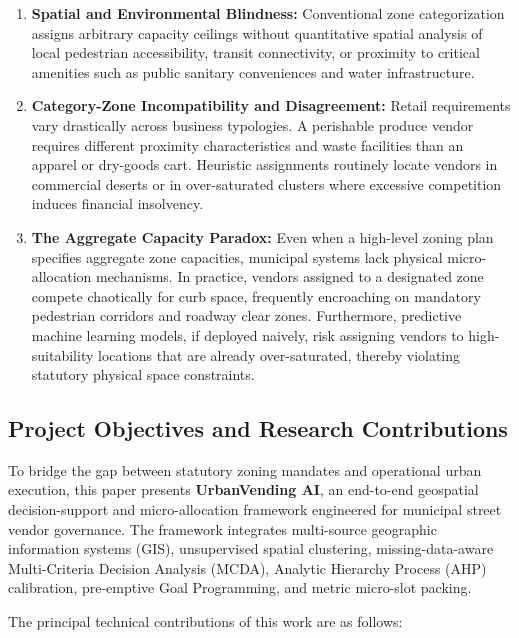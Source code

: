 \begin{enumerate}
    \item \textbf{Spatial and Environmental Blindness:} Conventional zone categorization assigns arbitrary capacity ceilings without quantitative spatial analysis of local pedestrian accessibility, transit connectivity, or proximity to critical amenities such as public sanitary conveniences and water infrastructure.
    \item \textbf{Category-Zone Incompatibility and Disagreement:} Retail requirements vary drastically across business typologies. A perishable produce vendor requires different proximity characteristics and waste facilities than an apparel or dry-goods cart. Heuristic assignments routinely locate vendors in commercial deserts or in over-saturated clusters where excessive competition induces financial insolvency.
    \item \textbf{The Aggregate Capacity Paradox:} Even when a high-level zoning plan specifies aggregate zone capacities, municipal systems lack physical micro-allocation mechanisms. In practice, vendors assigned to a designated zone compete chaotically for curb space, frequently encroaching on mandatory pedestrian corridors and roadway clear zones. Furthermore, predictive machine learning models, if deployed naively, risk assigning vendors to high-suitability locations that are already over-saturated, thereby violating statutory physical space constraints.
\end{enumerate}

\subsection{Project Objectives and Research Contributions}
\label{sec:objectives}

To bridge the gap between statutory zoning mandates and operational urban execution, this paper presents \textbf{UrbanVending AI}, an end-to-end geospatial decision-support and micro-allocation framework engineered for municipal street vendor governance. The framework integrates multi-source geographic information systems (GIS), unsupervised spatial clustering, missing-data-aware Multi-Criteria Decision Analysis (MCDA), Analytic Hierarchy Process (AHP) calibration, pre-emptive Goal Programming, and metric micro-slot packing.

The principal technical contributions of this work are as follows:

